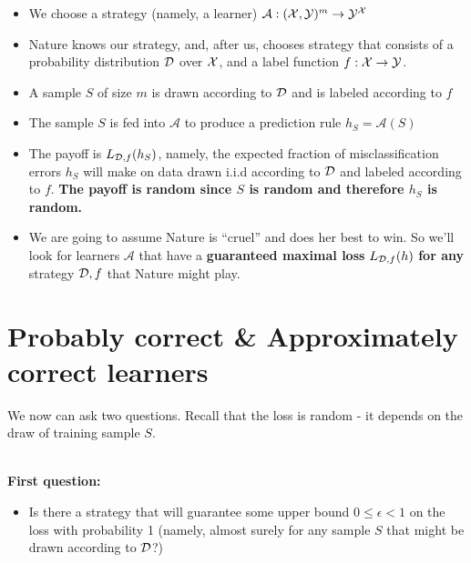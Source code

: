\documentclass[11pt]{article}
\newcommand{\Ac}{\mathcal{A}}
\begin{document}
{\begin{itemize}
    \item We choose a strategy (namely, a learner) $\Ac:(\X,\Y)^m \to \Y^\X$
      \item Nature knows our strategy, and, after us, chooses strategy that consists of a probability distribution $\mathcal{D}$ over $\mathcal{X}$, and a label function $f:\mathcal{X}\to\mathcal{Y}$. 
    \item A sample $S$ of size $m$ is drawn according to $\mathcal{D}$ and is labeled
      according to $f$
    \item The sample $S$ is fed into $\Ac$ to produce a prediction rule
      $h_S=\Ac(S)$
    \item The payoff is $L_{\mathcal{D},f}(h_S)$, namely, the expected fraction of misclassification errors $h_S$ will make on data drawn i.i.d according to $\mathcal{D}$ and labeled according to $f$.
    {\bf The payoff is random since $S$ is random and
      therefore $h_S$ is random.}
    \item We are going to assume Nature is ``cruel'' and does her best to win.
      So we'll look for learners $\Ac$ that have a {\bf guaranteed maximal 
      loss} $L_{\mathcal{D},f}(h)$ {\bf for any} strategy $\mathcal{D},f$ that Nature might play.
\end{itemize}

\section{Probably correct \& Approximately correct learners}
   We now can ask two questions. 
   Recall that the loss is random - it depends on the draw of training sample
       $S$.
       
       ~\\
{\bf First question:}\\   
   \begin{itemize}
     
      \item  Is there a strategy that will guarantee some upper bound $0\leq
       \epsilon<1$ on the loss 
   with probability 1 (namely, almost surely for any sample $S$ that might be
       drawn according to $\mathcal{D}$?) 
   \end{itemize}
  
}
\end{document}

